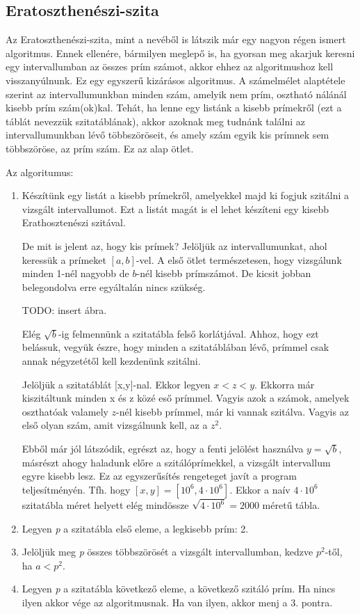 \documentclass[twoside, a4paper, 12pt]{article}
\begin{document}
\subsection{Eratoszthenészi-szita}

Az Eratoszthenészi-szita, mint a nevéből is látszik már egy nagyon régen ismert algoritmus. Ennek ellenére, bármilyen meglepő is, ha gyorsan meg akarjuk keresni egy intervallumban az összes prím számot, akkor ehhez az algoritmushoz kell visszanyúlnunk. Ez egy egyszerű kizárásos algoritmus. A számelmélet alaptétele szerint az intervallumunkban minden szám, amelyik nem prím, osztható nálánál kisebb prím szám(ok)kal. Tehát, ha lenne egy listánk a kisebb prímekről (ezt a táblát nevezzük szitatáblának), akkor azoknak meg tudnánk találni az intervallumunkban lévő többszöröseit, és amely szám egyik kis prímnek sem többszöröse, az prím szám. Ez az alap ötlet. \par
Az algoritumus: \par
\begin{enumerate}
\item Készítünk egy listát a kisebb prímekről, amelyekkel majd ki fogjuk szitálni a vizsgált intervallumot. Ezt a listát magát is el lehet készíteni egy kisebb Erathosztenészi szitával. \par
De mit is jelent az, hogy kis prímek? Jelöljük az intervallumunkat, ahol keressük a prímeket \( [a, b] \)-vel. A első ötlet természetesen, hogy vizsgálunk minden 1-nél nagyobb de \(b\)-nél kisebb prímszámot. De kicsit jobban belegondolva erre egyáltalán nincs szükség. \par 
TODO: insert ábra. \par
Elég $\sqrt{b}$-ig felmennünk a szitatábla felső korlátjával. Ahhoz, hogy ezt belássuk, vegyük észre, hogy minden a szitatáblában lévő, prímmel csak annak négyzetétől kell kezdenünk szitálni. \par 
Jelöljük a szitatáblát [x,y]-nal. Ekkor legyen $x < z < y$. Ekkorra már kiszitáltunk minden x és z közé eső prímmel. Vagyis azok a számok, amelyek oszthatóak valamely $z$-nél kisebb prímmel, már ki vannak szitálva. Vagyis az első olyan szám, amit vizsgálnunk kell, az a $z^2$. \par
Ebből már jól látszódik, egrészt az, hogy a fenti jelölést használva $y=\sqrt{b}$, másrészt ahogy haladunk előre a szitálóprímekkel, a vizsgált intervallum egyre kisebb lesz. Ez az egyszerűsítés rengeteget javít a program teljesítményén. Tfh. hogy $[x,y]=[10^6,4\cdot10^6]$. Ekkor a naív $4\cdot10^6$ szitatábla méret helyett elég mindössze $\sqrt{4\cdot10^6}=2000$ méretű tábla.
\item Legyen \textit{p} a szitatábla első eleme, a legkisebb prím: 2.
\item Jelöljük meg \textit{p} összes többszörösét a vizsgált intervallumban, kedzve $p^2$-től, ha $a<p^2 $.
\item Legyen \textit{p} a szitatábla következő eleme, a következő szitáló prím. Ha nincs ilyen akkor vége az algoritmusnak. Ha van ilyen, akkor menj a 3. pontra.
\end{enumerate}
\end{document}
